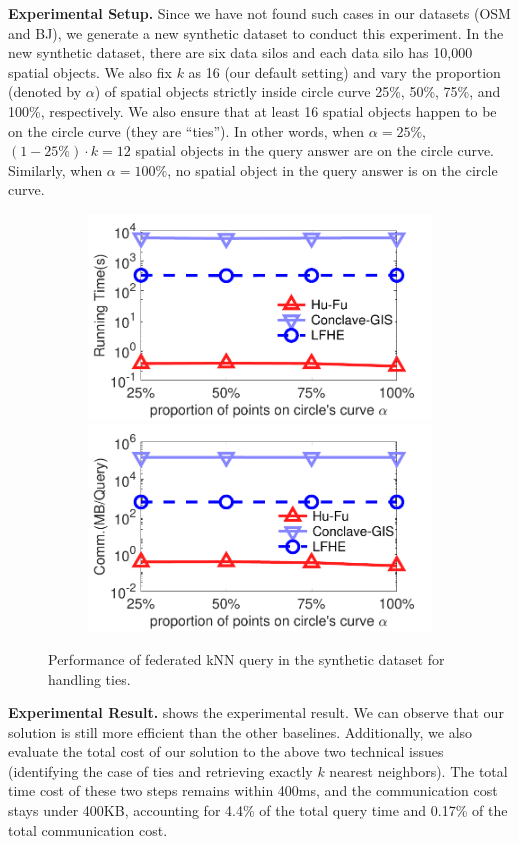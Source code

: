 \textbf{Experimental Setup.}
Since we have not found such cases in our datasets (OSM and BJ), we generate a new synthetic dataset to conduct this experiment.
In the new synthetic dataset, there are six data silos and each data silo has 10,000 spatial objects.
We also fix $k$ as 16 (\ie our default setting) and vary the proportion (denoted by $\alpha$) of spatial objects strictly inside circle curve 25\%, 50\%, 75\%, and 100\%, respectively.
We also ensure that at least 16 spatial objects happen to be on the circle curve (\ie they are ``ties'').
In other words, when $\alpha=25\%$, $(1-25\%) \cdot k = 12$ spatial objects in the query answer are on the circle curve.
Similarly, when $\alpha=100\%$, no spatial object in the query answer is on the circle curve.

\begin{figure}[t]
    \centering
    \begin{subfigure}{0.48\textwidth}
        \centering
        \includegraphics[width=0.48\linewidth]{apdx/random_knn_corner_time.pdf}
        \includegraphics[width=0.48\linewidth]{apdx/random_knn_corner_comm.pdf}
    \end{subfigure}
    \caption{Performance of  federated kNN query in the synthetic dataset for handling ties.}
    \label{fig:random-knn-corner}
\end{figure}

\textbf{Experimental Result.}
 shows the experimental result. 
We can observe that our solution \sysname is still more efficient than the other baselines.
Additionally, we also evaluate the total cost of our solution to the above two technical issues (\ie identifying the case of ties and retrieving exactly $k$ nearest neighbors).
The total time cost of these two steps remains within 400ms, and the communication cost stays under 400KB, accounting for 4.4\% of the total query time and 0.17\% of the total communication cost.

